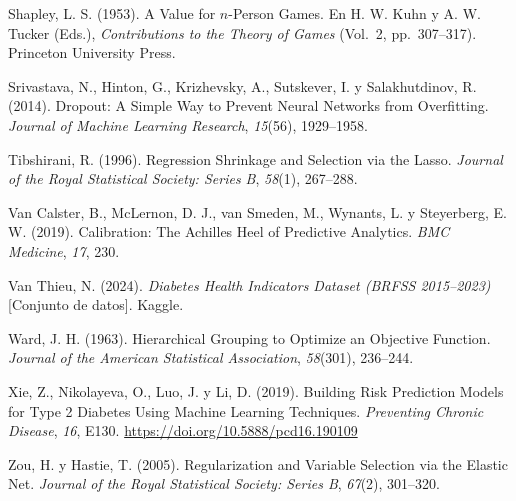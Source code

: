 \documentclass[conference,a4paper]{IEEEtran}
\begin{document}
\begin{thebibliography}{}
Shapley, L. S. (1953). A Value for $n$-Person Games. En H. W. Kuhn y A. W. Tucker (Eds.), \textit{Contributions to the Theory of Games} (Vol.~2, pp.~307–317). Princeton University Press.

Srivastava, N., Hinton, G., Krizhevsky, A., Sutskever, I. y Salakhutdinov, R. (2014). Dropout: A Simple Way to Prevent Neural Networks from Overfitting. \textit{Journal of Machine Learning Research}, \textit{15}(56), 1929–1958.

Tibshirani, R. (1996). Regression Shrinkage and Selection via the Lasso. \textit{Journal of the Royal Statistical Society: Series B}, \textit{58}(1), 267–288.

Van Calster, B., McLernon, D. J., van Smeden, M., Wynants, L. y Steyerberg, E. W. (2019). Calibration: The {Achilles} Heel of Predictive Analytics. \textit{BMC Medicine}, \textit{17}, 230.

Van Thieu, N. (2024). \textit{Diabetes Health Indicators Dataset ({BRFSS} 2015--2023)} [Conjunto de datos]. Kaggle.

Ward, J. H. (1963). Hierarchical Grouping to Optimize an Objective Function. \textit{Journal of the American Statistical Association}, \textit{58}(301), 236–244.

Xie, Z., Nikolayeva, O., Luo, J. y Li, D. (2019). Building Risk Prediction Models for Type 2 Diabetes Using Machine Learning Techniques. \textit{Preventing Chronic Disease}, \textit{16}, E130. \url{https://doi.org/10.5888/pcd16.190109}

Zou, H. y Hastie, T. (2005). Regularization and Variable Selection via the Elastic Net. \textit{Journal of the Royal Statistical Society: Series B}, \textit{67}(2), 301–320.

\end{thebibliography}
\end{document}
